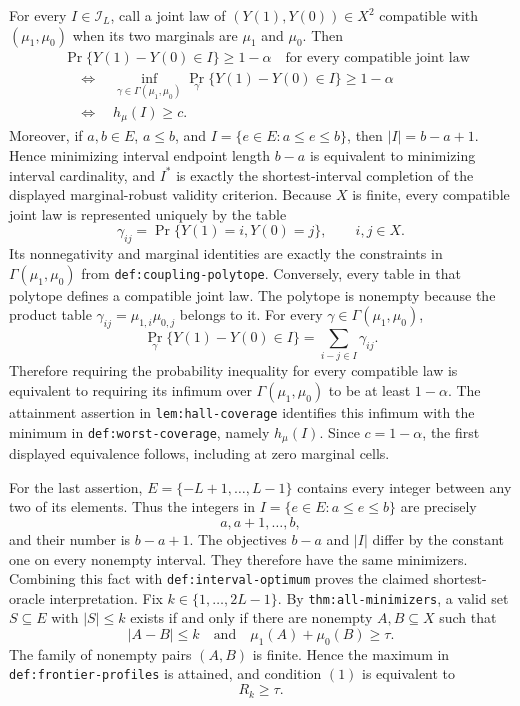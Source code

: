 For every \(I\in\mathcal I_L\), call a joint law of \((Y(1),Y(0))\in X^2\) compatible with \((\mu_1,\mu_0)\) when its two marginals are \(\mu_1\) and \(\mu_0\).  Then
\[
\begin{split}
&\Pr\{Y(1)-Y(0)\in I\}\geq 1-\alpha
   \quad\text{for every compatible joint law}\\
&\quad\Longleftrightarrow\quad
\inf_{\gamma\in\Gamma(\mu_1,\mu_0)}
\Pr_{\gamma}\{Y(1)-Y(0)\in I\}\geq1-\alpha\\
&\quad\Longleftrightarrow\quad h_{\mu}(I)\geq c.
\end{split}
\]
Moreover, if \(a,b\in E\), \(a\leq b\), and \(I=\{e\in E:a\leq e\leq b\}\), then \(|I|=b-a+1\).  Hence minimizing interval endpoint length \(b-a\) is equivalent to minimizing interval cardinality, and \(I^*\) is exactly the shortest-interval completion of the displayed marginal-robust validity criterion.
Because \(X\) is finite, every compatible joint law is represented uniquely by the table
\[
\gamma_{ij}=\Pr\{Y(1)=i,Y(0)=j\},\qquad i,j\in X.
\]
Its nonnegativity and marginal identities are exactly the constraints in \(\Gamma(\mu_1,\mu_0)\) from \texttt{def:coupling-polytope}.  Conversely, every table in that polytope defines a compatible joint law.  The polytope is nonempty because the product table \(\gamma_{ij}=\mu_{1,i}\mu_{0,j}\) belongs to it.  For every \(\gamma\in\Gamma(\mu_1,\mu_0)\),
\[
\Pr_{\gamma}\{Y(1)-Y(0)\in I\}
=\sum_{i-j\in I}\gamma_{ij}.
\]
Therefore requiring the probability inequality for every compatible law is equivalent to requiring its infimum over \(\Gamma(\mu_1,\mu_0)\) to be at least \(1-\alpha\).  The attainment assertion in \texttt{lem:hall-coverage} identifies this infimum with the minimum in \texttt{def:worst-coverage}, namely \(h_{\mu}(I)\).  Since \(c=1-\alpha\), the first displayed equivalence follows, including at zero marginal cells.

For the last assertion, \(E=\{-L+1,\ldots,L-1\}\) contains every integer between any two of its elements.  Thus the integers in \(I=\{e\in E:a\leq e\leq b\}\) are precisely
\[
a,a+1,\ldots,b,
\]
and their number is \(b-a+1\).  The objectives \(b-a\) and \(|I|\) differ by the constant one on every nonempty interval.  They therefore have the same minimizers.  Combining this fact with \texttt{def:interval-optimum} proves the claimed shortest-oracle interpretation.
Fix \(k\in\{1,\ldots,2L-1\}\).  By \texttt{thm:all-minimizers}, a valid set \(S\subseteq E\) with \(|S|\leq k\) exists if and only if there are nonempty \(A,B\subseteq X\) such that
\[
|A-B|\leq k
\quad\text{and}\quad
\mu_1(A)+\mu_0(B)\geq\tau.
\tag{1}
\]
The family of nonempty pairs \((A,B)\) is finite.  Hence the maximum in \texttt{def:frontier-profiles} is attained, and condition \((1)\) is equivalent to
\[
R_k\geq\tau.
\tag{2}
\]


